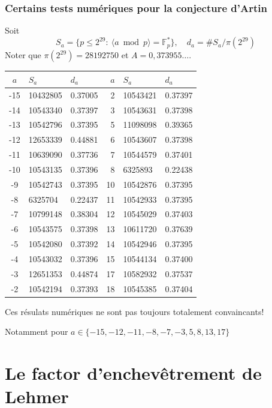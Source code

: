 \documentclass[10pt,handout]{beamer} %
\newcommand{\F}{\mathbb F}
\theoremstyle{definition}
\begin{document}
\begin{frame}
\frametitle{Certains tests num\'eriques pour la conjecture d'Artin}

Soit $$S_a=\{p\le 2^{29}:\ \langle a\bmod p\rangle=\F_p^*\},\quad d_a=\#S_a/\pi(2^{29})$$ 
Noter que $\pi(2^{29})=28192750$ et $A=0,373955\ldots$. \pause

\begin{center}
\begin{scriptsize}
\begin{tabular}{|c|l|l||r|l|l|}
\hline
$a$ & $S_a$ & $d_a$ & $a$& $S_a$ & $d_a$\\
\hline
-15& 10432805 &0.37005& 2& 10543421& 0.37397\\
-14& 10543340 &0.37397& 3& 10543631& 0.37398 \\
-13& 10542796 &0.37395& 5& 11098098& 0.39365 \\
-12& 12653339 &0.44881& 6& 10543607& 0.37398 \\
-11& 10639090 &0.37736& 7& 10544579& 0.37401 \\
-10& 10543135 &0.37396& 8& 6325893 & 0.22438 \\
-9 &10542743 &0.37395&10& 10542876& 0.37395 \\
-8 &6325704 &0.22437&11& 10542933& 0.37395 \\
-7 &10799148 &0.38304&12& 10545029& 0.37403\\
-6 &10543575 &0.37398&13& 10611720& 0.37639 \\
-5 &10542080 &0.37392&14& 10542946& 0.37395 \\
-4 &10543032 &0.37396&15& 10544134& 0.37400 \\
-3 &12651353 &0.44874&17& 10582932& 0.37537 \\
-2 &10542194 &0.37393&18& 10545385& 0.37404 \\\hline
\end{tabular}\end{scriptsize}
\end{center}
 \pause

Ces r\'esulats num\'eriques ne sont pas toujours totalement convaincants!\pause

\centerline{\alert{Notamment pour $a\in\{-15, -12, -11, -8, -7, -3, 5, 8, 13, 17\}$}}
\end{frame}

\section{Le factor d'enchev\^etrement de Lehmer}
\end{document}
